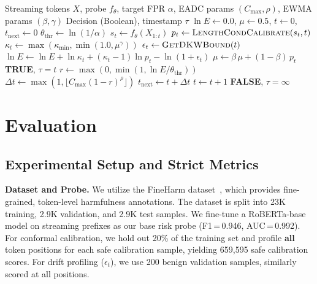 \documentclass[letterpaper,twocolumn,10pt]{article}
\begin{document}
\begin{algorithm}[t]
\caption{Conformal-EADC for Streaming Safety Detection}
\label{alg:main}
\begin{algorithmic}[1]
  \Require Streaming tokens $X$, probe $f_\theta$, target FPR $\alpha$, EADC params $(C_{\max}, \rho)$, EWMA params $(\beta, \gamma)$
  \Ensure Decision (Boolean), timestamp $\tau$
  \State $\ln E \gets 0.0$,\; $\mu \gets 0.5$,\; $t \gets 0$,\; $t_{\mathrm{next}} \gets 0$
  \State $\theta_{\mathrm{thr}} \gets \ln(1/\alpha)$
      \State $s_t \gets f_\theta(X_{1:t})$ \hfill {}
      \State $p_t \gets \textsc{LengthCondCalibrate}(s_t, t)$ \hfill {}
      \State $\kappa_t \gets \max(\kappa_{\min}, \min(1.0, \mu^\gamma))$
      \State $\epsilon_t \gets \textsc{GetDKWBound}(t)$ \hfill {}
      \State $\ln E \gets \ln E + \ln\kappa_t + (\kappa_t - 1)\ln p_t - \ln(1 + \epsilon_t)$
      \State $\mu \gets \beta\,\mu + (1 - \beta)\,p_t$
        \State \Return \textbf{TRUE}, $\tau = t$ \hfill {}
      \EndIf
      \State $r \gets \max(0, \min(1, \ln E / \theta_{\mathrm{thr}}))$
      \State $\Delta t \gets \max(1, \lfloor C_{\max}(1 - r)^\rho\rfloor)$
      \State $t_{\mathrm{next}} \gets t + \Delta t$
    \EndIf
    \State $t \gets t + 1$
  \EndWhile
  \State \Return \textbf{FALSE}, $\tau = \infty$
\end{algorithmic}
\end{algorithm}

\section{Evaluation}
\label{sec:eval}

\subsection{Experimental Setup and Strict Metrics}
\label{sec:setup}

\textbf{Dataset and Probe.}
We utilize the FineHarm dataset~\cite{fineharm2025}, which provides fine-grained, token-level harmfulness annotations.
The dataset is split into 23K training, 2.9K validation, and 2.9K test samples.
We fine-tune a RoBERTa-base~\cite{liu2019roberta} model on streaming prefixes as our base risk probe (F1\,=\,0.946, AUC\,=\,0.992).
For conformal calibration, we hold out 20\% of the training set and profile \textbf{all} token positions for each safe calibration sample, yielding 659,595 safe calibration scores.
For drift profiling ($\epsilon_t$), we use 200 benign validation samples, similarly scored at all positions.
\end{document}
